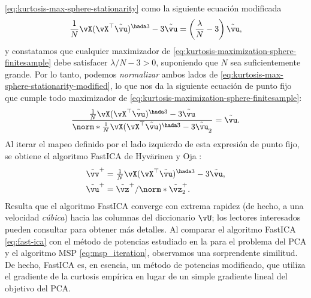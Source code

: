 \documentclass[../../book-main.tex]{subfiles}
\begin{document}
\eqref{eq:kurtosis-max-sphere-stationarity} como la siguiente ecuación modificada
\begin{align}\label{eq:kurtosis-max-sphere-stationarity-modified}
    \frac{1}{N}\vX (\vX^\top \tilde{\vu})^{\hada 3}
    -
    3 \tilde{\vu}
    =
    \left(
        \frac{\lambda}{N} - 3
    \right)
    \tilde{\vu},
\end{align}
y constatamos que cualquier maximizador de
\eqref{eq:kurtosis-maximization-sphere-finitesample}
debe satisfacer $\lambda / N - 3 > 0$,
suponiendo que $N$ sea suficientemente grande.
Por lo tanto, podemos \textit{normalizar} ambos lados de
\eqref{eq:kurtosis-max-sphere-stationarity-modified},
lo que nos da la siguiente ecuación de punto fijo que cumple todo
maximizador de \eqref{eq:kurtosis-maximization-sphere-finitesample}:
\begin{align}\label{eq:kurtosis-max-sphere-fxp}
    \frac{
        \frac{1}{N}\vX (\vX^\top \tilde{\vu})^{\hada 3}
        -
        3 \tilde{\vu}
    }{
        \norm*{
            \frac{1}{N}\vX (\vX^\top \tilde{\vu})^{\hada 3}
            -
            3 \tilde{\vu}
        }_2
    }
    =
    \tilde{\vu}.
\end{align}
Al iterar el mapeo definido por el lado izquierdo de esta expresión de punto fijo,
se obtiene el algoritmo FastICA de Hyvärinen y Oja \cite{hyvarinen-1997}:
\begin{equation}
    \begin{split}\label{eq:fast-ica}
        \tilde{\vv}^+ &= \tfrac{1}{N}\vX (\vX^\top
        \tilde{\vu})^{\hada 3}- 3 \tilde{\vu}
        ,  \\
        \tilde{\vu}^+ &= \tilde{\vz}^+ / \norm*{\tilde{\vz}^+}_2.
    \end{split}
\end{equation}
Resulta que el algoritmo FastICA converge con extrema rapidez (de hecho, a
una velocidad \textit{cúbica}) hacia las columnas del diccionario $\vU$; los lectores interesados
pueden consultar \cite{hyvarinen-1997} para obtener más detalles.
Al comparar el algoritmo FastICA \eqref{eq:fast-ica} con el método de potencias estudiado
en la  para el problema del PCA y el algoritmo MSP
\eqref{eq:msp_iteration}, observamos una sorprendente similitud. De hecho,
FastICA es, en esencia, un método de potencias modificado, que utiliza el
gradiente de la curtosis empírica en lugar de un simple gradiente lineal 
del objetivo del PCA.
\end{document}
